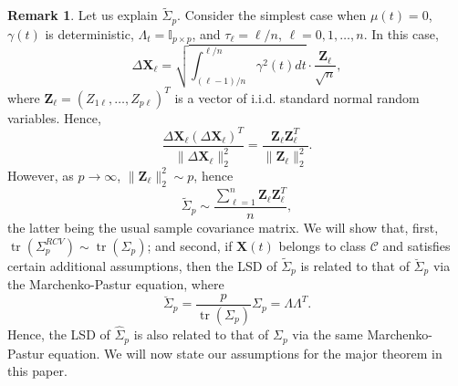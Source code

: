 \documentclass[a4paper,11pt]{book}
\theoremstyle{plain}
\theoremstyle{definition}
\newtheorem{rmrk}[thm]{Remark}
\newcommand{\tr}{\operatorname{tr}}
\begin{document}
    \begin{rmrk}
    	Let us explain $\widetilde{\Sigma}_p$. Consider the simplest case when $\mu(t) = 0$, $\gamma(t)$ is deterministic, $\Lambda_t = \mathbb{I}_{p \times p}$, and $\tau_{\ell} = \ell / n$, $\ell = 0, 1, \dots, n$. In this case,
    	\[ \Delta \mathbf{X}_\ell = \sqrt{\int_{(\ell - 1)/n}^{\ell / n} \gamma^2(t) dt }\cdot \frac{\mathbf{Z}_\ell}{\sqrt{n}}, \]
    	where $\mathbf{Z}_\ell = (Z_{1\ell}, \dots, Z_{p\ell})^T$ is a vector of i.i.d. standard normal random variables. Hence,
    	\[ \frac{\Delta \mathbf{X}_\ell (\Delta \mathbf{X}_\ell)^T}{\| \Delta \mathbf{X}_\ell \|_2^2} = \frac{\mathbf{Z}_\ell \mathbf{Z}_\ell^T}{\|  \mathbf{Z}_\ell \|_2^2}. \]
    	However, as $p \rightarrow \infty$, $\| \mathbf{Z}_\ell \|_2^2 \sim p$, hence
    	\[ \widetilde{\Sigma}_p \sim \frac{\sum_{\ell = 1}^{n}\mathbf{Z}_\ell \mathbf{Z}_\ell^T}{n}, \]
    	the latter being the usual sample covariance matrix.
    	We will show that, first, $\tr(\Sigma_p^{RCV}) \sim \tr(\Sigma_p)$; and second, if $\mathbf{X}(t)$ belongs to class $\mathcal{C}$ and satisfies certain additional assumptions, then the LSD of $\widetilde{\Sigma}_p$ is related to that of $\breve{\Sigma}_p$ via the Marchenko-Pastur equation, where
    	\[ \breve{\Sigma}_p = \frac{p}{\tr(\Sigma_p)}\Sigma_p = \Lambda \Lambda^T. \]
    	Hence, the LSD of $\widehat{\Sigma}_p$ is also related to that of $\Sigma_p$ via the same Marchenko-Pastur equation.
    	We will now state our assumptions for the major theorem in this paper.
    \end{rmrk}
    
\end{document}
